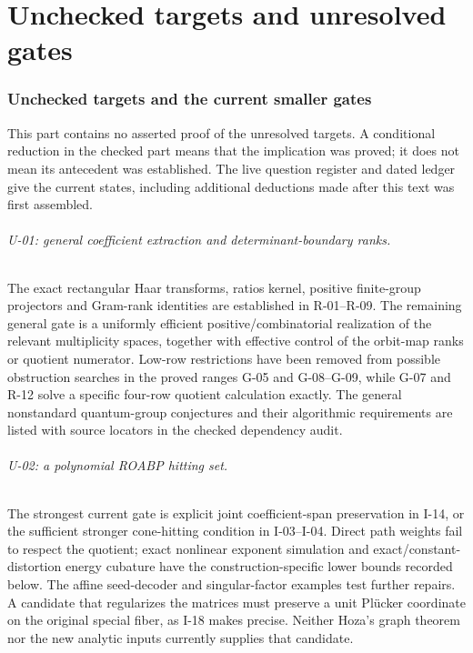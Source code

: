 \documentclass[11pt,a4paper]{article}
\theoremstyle{definition}\newtheorem{definition}{Definition}
\begin{document}
\part{Unchecked targets and unresolved gates}
\section{Unchecked targets and the current smaller gates}

This part contains no asserted proof of the unresolved targets. A conditional reduction in the checked part means that the implication was proved; it does not mean its antecedent was established. The live question register and dated ledger give the current states, including additional deductions made after this text was first assembled.

\paragraph{U-01: general coefficient extraction and determinant-boundary ranks.}
The exact rectangular Haar transforms, ratios kernel, positive finite-group projectors and Gram-rank identities are established in R-01--R-09. The remaining general gate is a uniformly efficient positive/combinatorial realization of the relevant multiplicity spaces, together with effective control of the orbit-map ranks or quotient numerator. Low-row restrictions have been removed from possible obstruction searches in the proved ranges G-05 and G-08--G-09, while G-07 and R-12 solve a specific four-row quotient calculation exactly. The general nonstandard quantum-group conjectures and their algorithmic requirements are listed with source locators in the checked dependency audit.

\paragraph{U-02: a polynomial ROABP hitting set.}
The strongest current gate is explicit joint coefficient-span preservation in I-14, or the sufficient stronger cone-hitting condition in I-03--I-04. Direct path weights fail to respect the quotient; exact nonlinear exponent simulation and exact/constant-distortion energy cubature have the construction-specific lower bounds recorded below. The affine seed-decoder and singular-factor examples test further repairs. A candidate that regularizes the matrices must preserve a unit Pl\"ucker coordinate on the original special fiber, as I-18 makes precise. Neither Hoza's graph theorem nor the new analytic inputs currently supplies that candidate.
\end{document}
